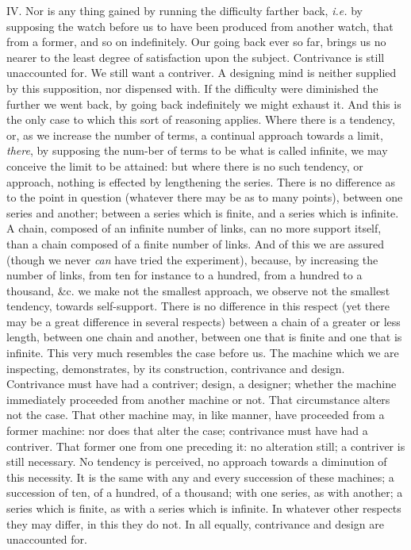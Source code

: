 IV. Nor is any thing gained by running the difficulty farther back,
\textit{i.e.} by supposing the watch before us to have been produced
from another watch, that from a former, and so on indefinitely. Our
going back ever so far, brings us no nearer to the least degree of
satisfaction upon the subject. Contrivance is still unaccounted for.
We still want a contriver. A designing mind is neither supplied by
this supposition, nor dispensed with. If the difficulty were
diminished the further we went back, by going back indefinitely we
might exhaust it. And this is the only case to which this sort of
reasoning applies. Where there is a tendency, or, as we increase the
number of terms, a continual approach towards a limit, \textit{there},
by supposing the num-ber of terms to be what is called
infinite, we may conceive the limit to be attained: but where there is
no such tendency, or approach, nothing is effected by lengthening the
series. There is no difference as to the point in question (whatever
there may be as to many points), between one series and another;
between a series which is finite, and a series which is infinite. A
chain, composed of an infinite number of links, can no more support
itself, than a chain composed of a finite number of links. And of this
we are assured (though we never \textit{can} have tried the
experiment), because, by increasing the number of links, from ten for
instance to a hundred, from a hundred to a thousand, \&c. we make not
the smallest approach, we observe not the smallest tendency, towards
self-support. There is no difference in this respect (yet there may be
a great difference in several respects) between a chain of a greater
or less length, between one chain and another, between one that is
finite and one that is infinite. This very much resembles the case
before us. The machine which we are inspecting, demonstrates, by its
construction, contrivance and design. Contrivance must have had a
contriver; design, a designer; whether the machine immediately
proceeded from another machine or  not. That circumstance
alters not the case. That other machine may, in like manner, have
proceeded from a former machine: nor does that alter the case;
contrivance must have had a contriver. That former one from one
preceding it: no alteration still; a contriver is still necessary. No
tendency is perceived, no approach towards a diminution of this
necessity. It is the same with any and every succession of these
machines; a succession of ten, of a hundred, of a thousand; with one
series, as with another; a series which is finite, as with a series
which is infinite. In whatever other respects they may differ, in this
they do not. In all equally, contrivance and design are unaccounted
for.


